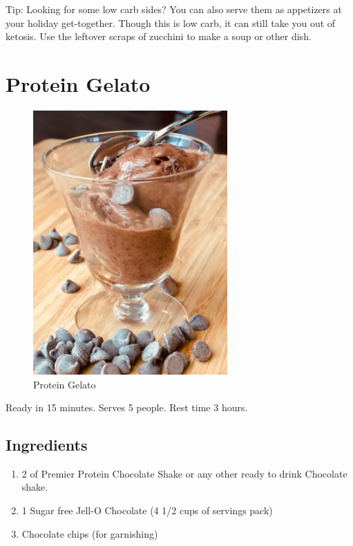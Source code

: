\documentclass[
  oneside]{book}
\begin{document}
Tip:
Looking for some low carb sides? You can also serve them as appetizers at your holiday get-together. Though this is low carb, it can still take you out of ketosis. Use the leftover scraps of zucchini to make a soup or other dish.

\hypertarget{protein-gelato}{%
\section{Protein Gelato}\label{protein-gelato}}

\begin{figure}
\centering
\includegraphics{pictures/protein-gelato.png}
\caption{Protein Gelato}
\end{figure}

Ready in 15 minutes. Serves 5 people. Rest time 3 hours.

\hypertarget{ingredients-5}{%
\subsection{Ingredients}\label{ingredients-5}}

\begin{enumerate}
\def\labelenumi{\arabic{enumi}.}
\item
  2 of Premier Protein Chocolate Shake or any other ready to drink Chocolate shake.
\item
  1 Sugar free Jell-O Chocolate (4 1/2 cups of servings pack)
\item
  Chocolate chips (for garnishing)
\end{enumerate}
\end{document}
